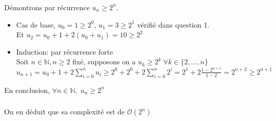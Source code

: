 \documentclass[french]{article}
\begin{document}
\subsubsection{}
Démontrons par récurrence $u_{n} \geq 2^n$.
	\begin{itemize}
	\item 
	Cas de base, $u_{0}=1 \geq 2^0$,  $u_{1} = 3 \geq 2^1$ vérifié dans question 1.\\ Et $u_{2}=u_{0} +1+2(u_{0}+u_{1}) = 10 \geq 2^2$
	\item
	Induction: par récurrence forte\\
Soit $n \in \mathbb{N}, n\geq2 $ fixé, supposons on a $u_{k} \geq 2^k \; \forall k \in \{2, ..., n\}$\\
$u_{n+1}=u_{0}+1+2\sum_{i=0}^{n} u_{i} \geq 2^0 +2^0 + 2\sum_{i=0}^{n} 2^i = 2^1 + 2\frac{1-2^{n+1}}{1-2} = 2^{n+2}  \geq 2^{n+1}$

	\end{itemize}
\par
En conclusion, $\forall n \in \mathbb{N}, \; u_{n}  \geq 2^n$

\subsubsection{}
On en déduit que sa complexité est de $\mathcal{O}(2^n)$
\end{document}
